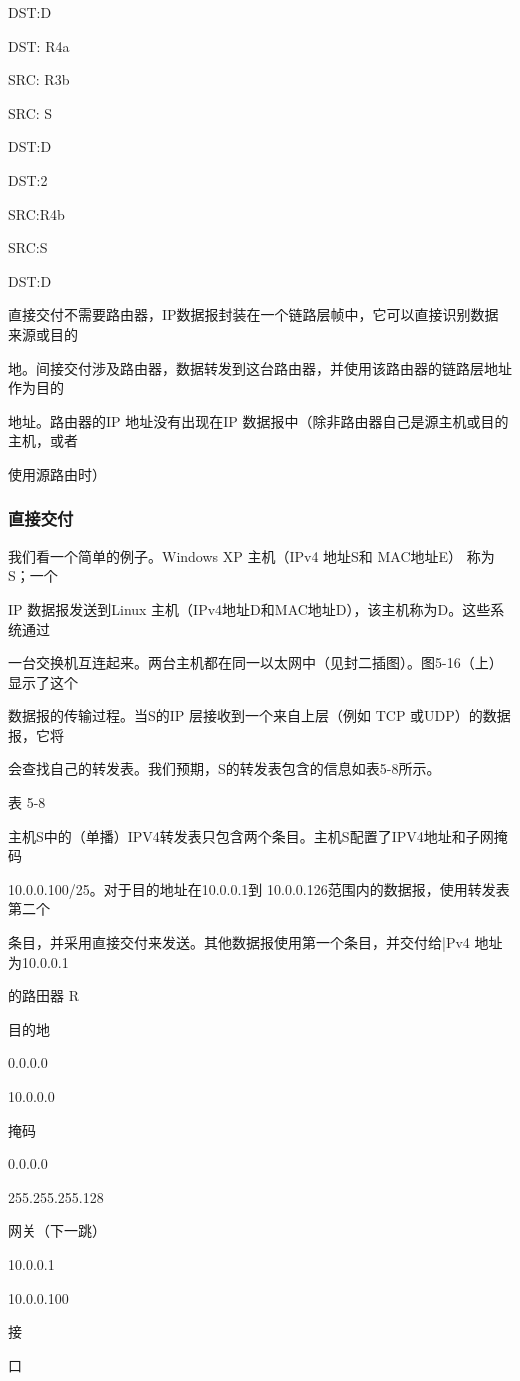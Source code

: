 DST:D

DST: R4a

SRC: R3b

SRC: S

DST:D

DST:2

SRC:R4b

SRC:S

DST:D

直接交付不需要路由器，IP数据报封装在一个链路层帧中，它可以直接识别数据来源或目的

地。间接交付涉及路由器，数据转发到这台路由器，并使用该路由器的链路层地址作为目的

地址。路由器的IP 地址没有出现在IP 数据报中（除非路由器自己是源主机或目的主机，或者

使用源路由时）

\subsubsection{直接交付}
我们看一个简单的例子。Windows XP 主机（IPv4 地址S和 MAC地址E） 称为S；一个

IP 数据报发送到Linux 主机（IPv4地址D和MAC地址D），该主机称为D。这些系统通过

一台交换机互连起来。两台主机都在同一以太网中（见封二插图）。图5-16（上）显示了这个

数据报的传输过程。当S的IP 层接收到一个来自上层（例如 TCP 或UDP）的数据报，它将

会查找自己的转发表。我们预期，S的转发表包含的信息如表5-8所示。

表 5-8

主机S中的（单播）IPV4转发表只包含两个条目。主机S配置了IPV4地址和子网掩码

10.0.0.100/25。对于目的地址在10.0.0.1到 10.0.0.126范围内的数据报，使用转发表第二个

条目，并采用直接交付来发送。其他数据报使用第一个条目，并交付给|Pv4 地址为10.0.0.1

的路田器 R

目的地

0.0.0.0

10.0.0.0

掩码

0.0.0.0

255.255.255.128

网关（下一跳）

10.0.0.1

10.0.0.100

接

口


